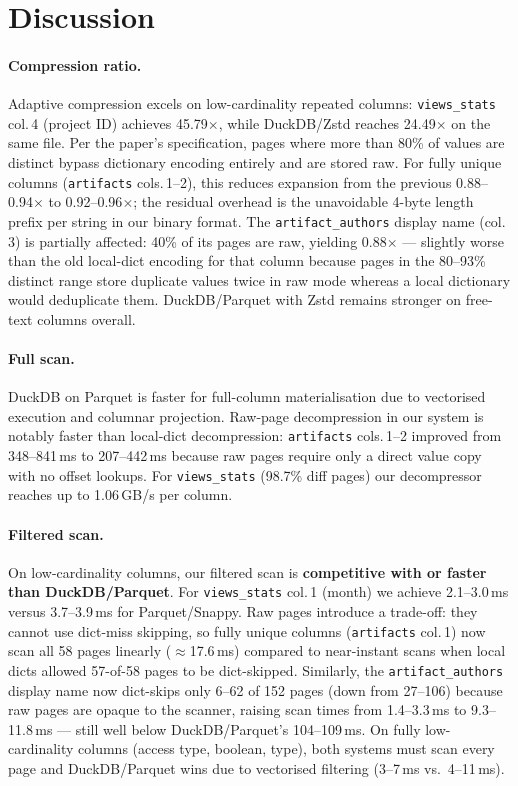 \documentclass[a4paper,11pt]{article}
\begin{document}
\section{Discussion}

\paragraph{Compression ratio.}
Adaptive compression excels on low-cardinality repeated columns:
\texttt{views\_stats} col.\,4 (project ID) achieves 45.79$\times$, while
DuckDB/Zstd reaches 24.49$\times$ on the same file. Per the paper's
specification, pages where more than 80\% of values are distinct bypass
dictionary encoding entirely and are stored raw. For fully unique columns
(\texttt{artifacts} cols.\,1--2), this reduces expansion from the previous
0.88--0.94$\times$ to 0.92--0.96$\times$; the residual overhead is the
unavoidable 4-byte length prefix per string in our binary format. The
\texttt{artifact\_authors} display name (col.\,3) is partially affected:
40\% of its pages are raw, yielding 0.88$\times$ — slightly worse than
the old local-dict encoding for that column because pages in the
80--93\% distinct range store duplicate values twice in raw mode whereas
a local dictionary would deduplicate them. DuckDB/Parquet with Zstd
remains stronger on free-text columns overall.

\paragraph{Full scan.}
DuckDB on Parquet is faster for full-column materialisation due to
vectorised execution and columnar projection. Raw-page decompression in
our system is notably faster than local-dict decompression: \texttt{artifacts}
cols.\,1--2 improved from 348--841\,ms to 207--442\,ms because raw pages
require only a direct value copy with no offset lookups. For
\texttt{views\_stats} (98.7\% diff pages) our decompressor reaches up to
1.06\,GB/s per column.

\paragraph{Filtered scan.}
On low-cardinality columns, our filtered scan is \textbf{competitive with
or faster than DuckDB/Parquet}. For \texttt{views\_stats} col.\,1 (month)
we achieve 2.1--3.0\,ms versus 3.7--3.9\,ms for Parquet/Snappy. Raw pages
introduce a trade-off: they cannot use dict-miss skipping, so fully unique
columns (\texttt{artifacts} col.\,1) now scan all 58 pages linearly
($\approx$17.6\,ms) compared to near-instant scans when local dicts
allowed 57-of-58 pages to be dict-skipped. Similarly, the
\texttt{artifact\_authors} display name now dict-skips only 6--62 of 152
pages (down from 27--106) because raw pages are opaque to the scanner,
raising scan times from 1.4--3.3\,ms to 9.3--11.8\,ms --- still well
below DuckDB/Parquet's 104--109\,ms. On fully low-cardinality columns
(access type, boolean, type), both systems must scan every page and
DuckDB/Parquet wins due to vectorised filtering (3--7\,ms vs.\ 4--11\,ms).
\end{document}
